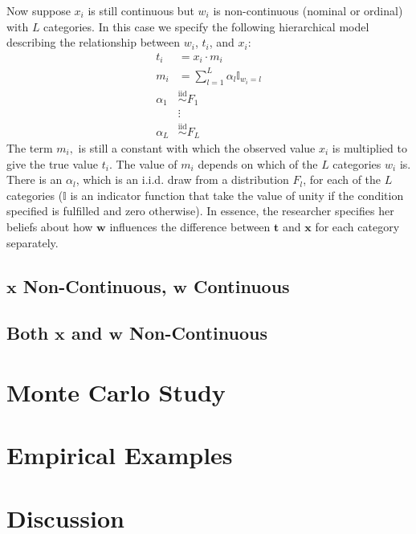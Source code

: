 \documentclass[fignum,letterpaper,12pt]{article}
\newcommand{\iid}{\stackrel{\mathrm{iid}}{\sim}}
\begin{document}
Now suppose $x_i$ is still continuous but $w_i$ is non-continuous (nominal or ordinal) with $L$ categories. In this case we specify the following hierarchical model describing the relationship between $w_i$, $t_i$, and $x_i$:
\begin{equation}
\begin{array}{rl}
t_i & = x_i \cdot m_i \\
m_{i} & = \sum_{l=1}^{L} \alpha_l \mathbb{I}_{w_i=l} \\
\alpha_1 & \iid F_1\\
& \vdots \\
\alpha_L & \iid F_L
\end{array}
\end{equation}
The term $m_i,$ is still a constant with which the observed value $x_i$ is multiplied to give the true value $t_i$. The value of $m_i$ depends on which of the $L$ categories $w_i$ is. There is an $\alpha_l$, which is an i.i.d. draw from a distribution $F_l$, for each of the $L$ categories ($\mathbb{I}$ is an indicator function that take the value of unity if the condition specified is fulfilled and zero otherwise). In essence, the researcher specifies her beliefs about how $\mathbf{w}$ influences the difference between $\mathbf{t}$ and $\mathbf{x}$ for each category separately.


\subsection{$\mathbf{x}$ Non-Continuous, $\mathbf{w}$ Continuous} \label{subsec:case3}

\subsection{Both $\mathbf{x}$ and $\mathbf{w}$ Non-Continuous} \label{subsec:case4}





\section{Monte Carlo Study} \label{sec:montecarlo}



\section{Empirical Examples} \label{sec:examples}



\section{Discussion} \label{sec:conclusion}



\clearpage
\singlespacing
{}

\end{document}
